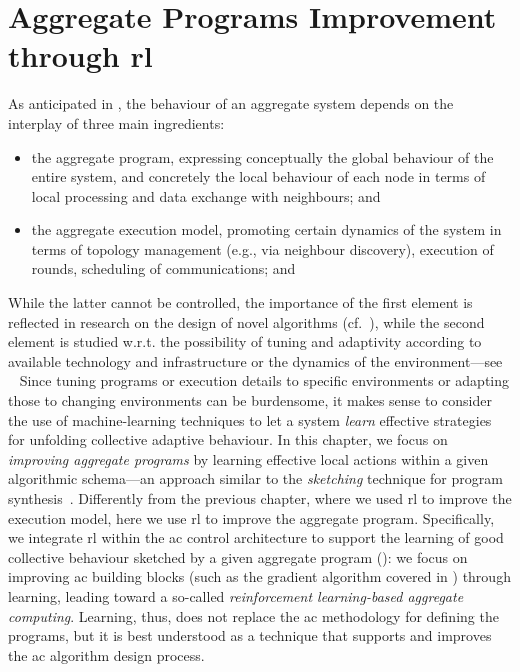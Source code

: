 \section{Aggregate Programs Improvement through \ac{rl}}

As anticipated in , 
 the behaviour of an aggregate system depends on the interplay of three main ingredients:
\begin{itemize}
  \item the aggregate program, expressing conceptually the global behaviour of the entire system, and concretely the local behaviour of each node in terms of local processing and data exchange with neighbours; and
  \item the aggregate execution model, promoting certain dynamics of the system in terms of topology management (e.g., via neighbour discovery), execution of rounds, scheduling of communications; and
\end{itemize}
%
While the latter cannot be controlled, 
 the importance of the first element is reflected in research
 on the design of novel algorithms (cf.~\cite{DBLP:journals/jlap/ViroliBDACP19,DBLP:conf/saso/AudritoCDV17}),
 while the second element is studied 
 w.r.t. the possibility of tuning and adaptivity 
 according to 
 available technology and infrastructure 
 or the dynamics of the environment---see ~ %
%
Since tuning programs or execution details to specific environments
 or adapting those to changing environments
 can be burdensome,
 it makes sense to consider the use of machine-learning techniques
 to let a system \emph{learn} effective strategies for unfolding collective adaptive behaviour.
%
In this chapter, we focus on \emph{improving aggregate programs}
 by learning effective local actions
 within a given algorithmic schema---an approach similar to the \emph{sketching} technique for program synthesis~\cite{solar2008program-synthesis-sketching}.
Differently from the previous chapter, 
 where we used \ac{rl} to improve the execution model, 
 here we use \ac{rl} to improve the aggregate program.
%
Specifically, we integrate \ac{rl} within the \ac{ac} control architecture to support the learning of good collective behaviour sketched by a given aggregate program (): 
 we focus on improving \ac{ac} building blocks (such as the gradient algorithm covered in ) through learning, 
 leading toward a so-called \emph{reinforcement learning-based aggregate computing}. 
%
Learning, thus, does not replace the \ac{ac} methodology for defining the programs, 
 but it is best understood as a technique that supports and improves the \ac{ac} algorithm design process.

